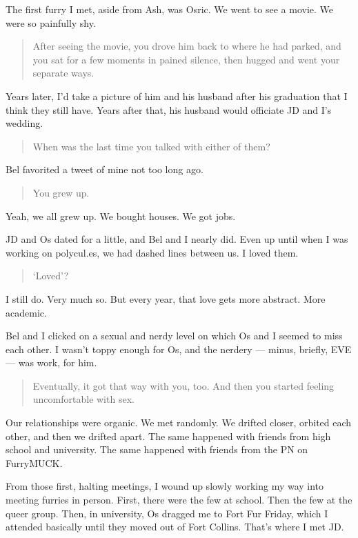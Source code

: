 The first furry I met, aside from Ash, was Osric. We went to see a movie. We were so painfully shy.

\begin{quote}
After seeing the movie, you drove him back to where he had parked, and you sat for a few moments in pained silence, then hugged and went your separate ways.
\end{quote}

Years later, I'd take a picture of him and his husband after his graduation that I think they still have. Years after that, his husband would officiate JD and I's wedding.

\begin{quote}
When was the last time you talked with either of them?
\end{quote}

Bel favorited a tweet of mine not too long ago.

\begin{quote}
You grew up.
\end{quote}

Yeah, we all grew up. We bought houses. We got jobs.

JD and Os dated for a little, and Bel and I nearly did. Even up until when I was working on polycul.es, we had dashed lines between us. I loved them.

\begin{quote}
`Loved'?
\end{quote}

I still do. Very much so. But every year, that love gets more abstract. More academic.

Bel and I clicked on a sexual and nerdy level on which Os and I seemed to miss each other. I wasn't toppy enough for Os, and the nerdery --- minus, briefly, EVE --- was work, for him.

\begin{quote}
Eventually, it got that way with you, too. And then you started feeling uncomfortable with sex.
\end{quote}

Our relationships were organic. We met randomly. We drifted closer, orbited each other, and then we drifted apart. The same happened with friends from high school and university. The same happened with friends from the PN on FurryMUCK.

From those first, halting meetings, I wound up slowly working my way into meeting furries in person. First, there were the few at school. Then the few at the queer group. Then, in university, Os dragged me to Fort Fur Friday, which I attended basically until they moved out of Fort Collins. That's where I met JD.

